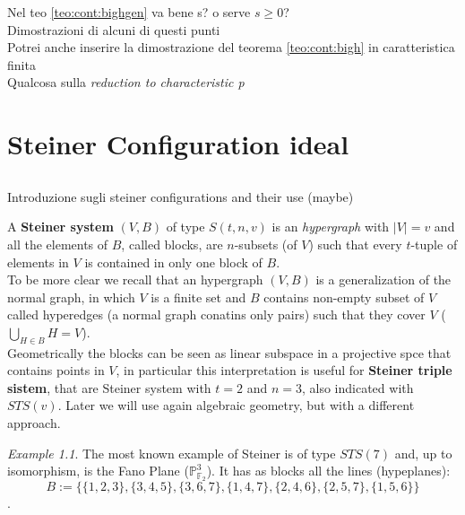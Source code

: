 \documentclass[]{book}
\theoremstyle{plain}
\theoremstyle{remark}
\newtheorem{ex}[rem]{Example}
\theoremstyle{definition}
\newcommand{\PP}{\mathbb{P}}
\begin{document}
\begin{tboxque}
Nel teo \ref{teo:cont:bighgen} va bene s? o serve $ s\geq 0 $?\\
Dimostrazioni di alcuni di questi punti\\
Potrei anche inserire la dimostrazione del teorema \ref{teo:cont:bigh} in caratteristica finita\\
Qualcosa sulla \textit{reduction to characteristic p}
\end{tboxque}

 	
	


\chapter{Steiner Configuration ideal}
\section*{}
\begin{tboxtodo}
Introduzione sugli steiner configurations and their use (maybe)
\end{tboxtodo}

A \textbf{Steiner system} $ (V,B) $ of type $ S(t,n,v) $ is an \textit{hypergraph} with $ |V|=v $ and all the elements of $ B $, called blocks, are $ n $-subsets (of $ V $) such that every $ t $-tuple of elements in $ V $ is contained in only one block of $ B $. \\
To be more clear we recall that an hypergraph $ (V,B) $ is a generalization of the normal graph, in which $ V $ is a finite set and $ B $ contains non-empty subset of $ V $ called hyperedges (a normal graph conatins only pairs) such that they cover $ V $ ($ \bigcup_{H \in B} H = V $).\\
Geometrically the blocks can be seen as linear subspace in a projective spce that contains points in $ V $, in particular this interpretation is useful for \textbf{Steiner triple sistem}, that are Steiner system with $ t=2 $ and $ n=3 $, also indicated with $ STS(v) $. Later we will use again algebraic geometry, but with a different approach.

\begin{ex} \label{ex:fano1}
	The most known example of Steiner is of type $ STS(7) $ and, up to isomorphism, is the Fano Plane ($ \PP_{\mathbb{F}_2}^3 $). It has as blocks all the lines (hypeplanes):
	\[B := \{\{1, 2, 3\}, \{3, 4, 5\}, \{3, 6, 7\}, \{1, 4, 7\}, \{2, 4, 6\}, \{2, 5, 7\}, \{1, 5, 6\}\}\].
\end{ex}
\end{document}
